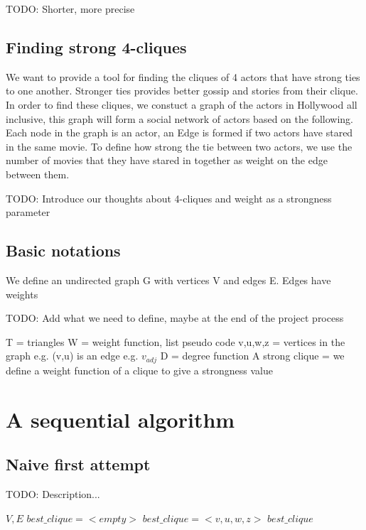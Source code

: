 \documentclass{article}
\begin{document}
TODO: Shorter, more precise


\subsection{Finding strong 4-cliques}
\noindent We want to provide a tool for finding the cliques of 4 actors that have strong ties to one another. Stronger ties provides better gossip and stories from their clique. In order to find these cliques, we constuct a graph of the actors in Hollywood all inclusive, this graph will form a social network of actors based on the following.
Each node in the graph is an actor, an Edge is formed if two actors have stared in the same movie. To define how strong the tie between two actors, we use the number of movies that they have stared in together as weight on the edge between them.

TODO: Introduce our thoughts about 4-cliques and weight as a strongness parameter

\subsection{Basic notations}
We define an undirected graph G with vertices V and edges E.
Edges have weights

TODO: Add what we need to define, maybe at the end of the project process

T = triangles
W = weight function, list pseudo code
v,u,w,z = vertices in the graph
e.g. (v,u) is an edge
e.g. $v_{adj}$
D = degree function
A strong clique = we define a weight function of a clique to give a strongness value


\section{A sequential algorithm}

\subsection{Naive first attempt}
TODO: Description...

\begin{algorithm}
\caption{$4clique\_iterator$}
\begin{algorithmic}
\REQUIRE $V,E$
\STATE $best\_clique = <empty>$
\STATE $best\_clique = <v,u,w,z>$
\ENDIF
\ENDIF
\ENDFOR
\ENDIF
\ENDFOR
\ENDFOR
\ENDFOR
\RETURN $best\_clique$
\end{algorithmic}
\end{algorithm}
\end{document}
